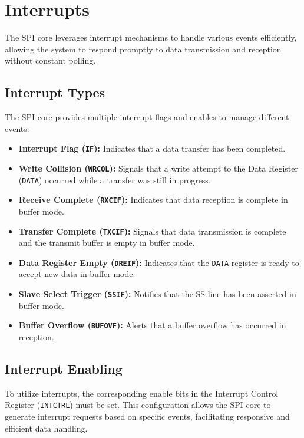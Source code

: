 \documentclass{article}
\begin{document}
\section{Interrupts}
The SPI core leverages interrupt mechanisms to handle various events efficiently, allowing the system to respond promptly to data transmission and reception without constant polling.

\subsection{Interrupt Types}
The SPI core provides multiple interrupt flags and enables to manage different events:

\begin{itemize}
    \item \textbf{Interrupt Flag (\texttt{IF}):} Indicates that a data transfer has been completed.
    \item \textbf{Write Collision (\texttt{WRCOL}):} Signals that a write attempt to the Data Register (\texttt{DATA}) occurred while a transfer was still in progress.
    \item \textbf{Receive Complete (\texttt{RXCIF}):} Indicates that data reception is complete in buffer mode.
    \item \textbf{Transfer Complete (\texttt{TXCIF}):} Signals that data transmission is complete and the transmit buffer is empty in buffer mode.
    \item \textbf{Data Register Empty (\texttt{DREIF}):} Indicates that the \texttt{DATA} register is ready to accept new data in buffer mode.
    \item \textbf{Slave Select Trigger (\texttt{SSIF}):} Notifies that the SS line has been asserted in buffer mode.
    \item \textbf{Buffer Overflow (\texttt{BUFOVF}):} Alerts that a buffer overflow has occurred in reception.
\end{itemize}

\subsection{Interrupt Enabling}
To utilize interrupts, the corresponding enable bits in the Interrupt Control Register (\texttt{INTCTRL}) must be set. This configuration allows the SPI core to generate interrupt requests based on specific events, facilitating responsive and efficient data handling.
\end{document}
